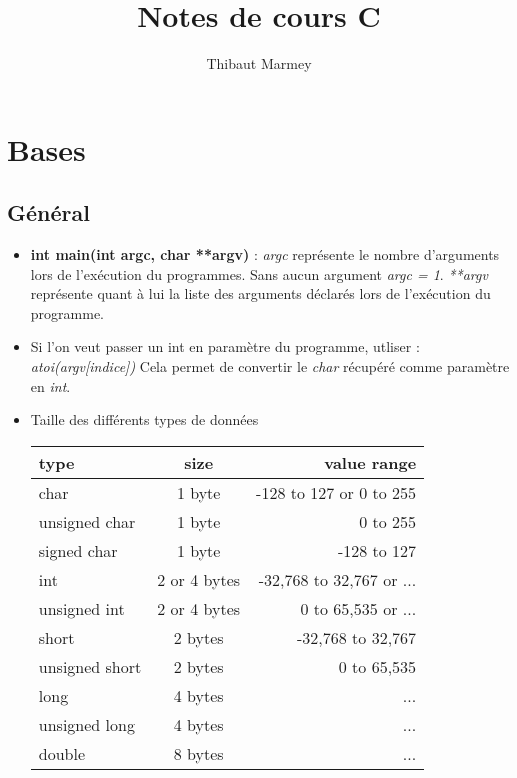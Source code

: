 \documentclass[12pt,a4paper]{article}
\author{Thibaut Marmey}
\title{Notes de cours C}
\begin{document}
	\maketitle
	
\begin{normalsize}
\tableofcontents
\end{normalsize}

\section{Bases}
\subsection{Général}
\begin{itemize}
\item \textbf{int main(int argc, char **argv)} : \textit{argc} représente le nombre d'arguments lors de l'exécution du programmes. Sans aucun argument \textit{argc = 1}.
\textit{**argv} représente quant à lui la liste des arguments déclarés lors de l'exécution du programme.
\item Si l'on veut passer un int en paramètre du programme, utliser : \textit{atoi(argv[indice])}
\newline Cela permet de convertir le \textit{char} récupéré comme paramètre en \textit{int}.
\item Taille des différents types de données
\newline
\begin{tabular}{|l|c|r|}
  \hline
  type & size & value range \\
  \hline \hline
  char & 1 byte & -128 to 127 or 0 to 255 \\ \hline
  unsigned char & 1 byte & 0 to 255 \\ \hline
  signed char & 1 byte & -128 to 127 \\ \hline
  int & 2 or 4 bytes & -32,768 to 32,767 or ... \\ \hline
  unsigned int & 2 or 4 bytes & 0 to 65,535 or ... \\ \hline
  short & 2 bytes & -32,768 to 32,767 \\ \hline
  unsigned short & 2 bytes & 0 to 65,535 \\ \hline
  long & 4 bytes & ... \\ \hline
  unsigned long & 4 bytes & ... \\ \hline
  double & 8 bytes & ... \\ \hline
\end{tabular}

\end{itemize}
\end{document}
